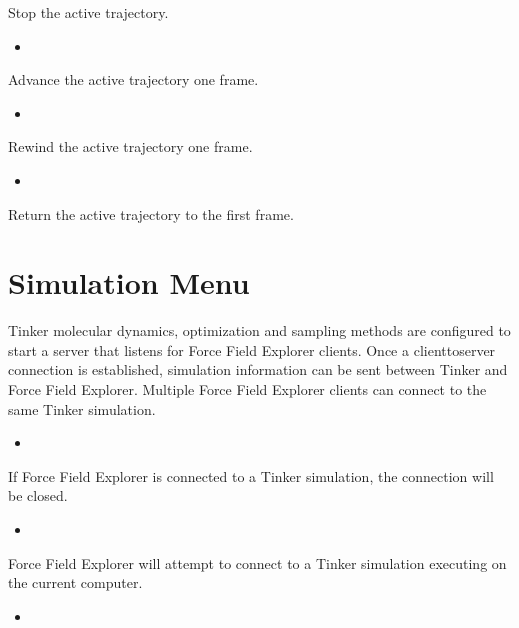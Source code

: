 \documentclass[letterpaper,11pt,english]{sphinxmanual}
\begin{document}
\sphinxAtStartPar
Stop the active trajectory.
\begin{itemize}
\item {} 
\sphinxAtStartPar
{}

\end{itemize}

\sphinxAtStartPar
Advance the active trajectory one frame.
\begin{itemize}
\item {} 
\sphinxAtStartPar
{}

\end{itemize}

\sphinxAtStartPar
Rewind the active trajectory one frame.
\begin{itemize}
\item {} 
\sphinxAtStartPar
{}

\end{itemize}

\sphinxAtStartPar
Return the active trajectory to the first frame.


\section{Simulation Menu}
\label{\detokenize{text/menus:simulation-menu}}
\sphinxAtStartPar
Tinker molecular dynamics, optimization and sampling methods are configured to start a server that listens for Force Field Explorer clients. Once a client\sphinxhyphen{}to\sphinxhyphen{}server connection is established, simulation information can be sent between Tinker and Force Field Explorer. Multiple Force Field Explorer clients can connect to the same Tinker simulation.
\begin{itemize}
\item {} 
\sphinxAtStartPar
{}

\end{itemize}

\sphinxAtStartPar
If Force Field Explorer is connected to a Tinker simulation, the connection will be closed.
\begin{itemize}
\item {} 
\sphinxAtStartPar
{}

\end{itemize}

\sphinxAtStartPar
Force Field Explorer will attempt to connect to a Tinker simulation executing on the current computer.
\begin{itemize}
\item {} 
\sphinxAtStartPar
{}

\end{itemize}
\end{document}
